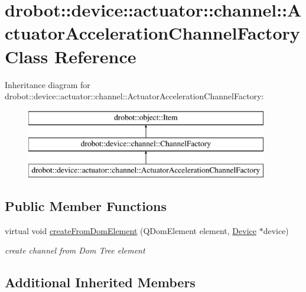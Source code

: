 \hypertarget{classdrobot_1_1device_1_1actuator_1_1channel_1_1ActuatorAccelerationChannelFactory}{\section{drobot\-:\-:device\-:\-:actuator\-:\-:channel\-:\-:Actuator\-Acceleration\-Channel\-Factory Class Reference}
\label{classdrobot_1_1device_1_1actuator_1_1channel_1_1ActuatorAccelerationChannelFactory}
}
Inheritance diagram for drobot\-:\-:device\-:\-:actuator\-:\-:channel\-:\-:Actuator\-Acceleration\-Channel\-Factory\-:\begin{figure}[H]
\begin{center}
\leavevmode
\includegraphics[height=3.000000cm]{classdrobot_1_1device_1_1actuator_1_1channel_1_1ActuatorAccelerationChannelFactory}
\end{center}
\end{figure}
\subsection*{Public Member Functions}
\begin{DoxyCompactItemize}
\item 
virtual void \hyperlink{classdrobot_1_1device_1_1actuator_1_1channel_1_1ActuatorAccelerationChannelFactory_a077744d3866b134b15cfe9522eeb99e3}{create\-From\-Dom\-Element} (Q\-Dom\-Element element, \hyperlink{classdrobot_1_1device_1_1Device}{Device} $\ast$device)
\begin{DoxyCompactList}\small\item\em create channel from Dom Tree element \end{DoxyCompactList}\end{DoxyCompactItemize}
\subsection*{Additional Inherited Members}


